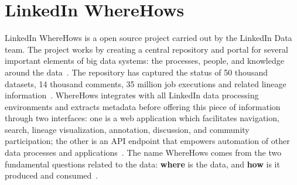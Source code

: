 \section{LinkedIn WhereHows}

LinkedIn WhereHows is a open source project carried out by the LinkedIn Data team. The project works 
by creating a central repository and portal for several important elements of big data systems: the 
processes, people, and knowledge around the data~\cite{hid-sp18-405-www-wherehows}. The 
repository has captured the status of 50 thousand datasets, 14 thousand comments, 35 million job 
executions and related lineage information~\cite{hid-sp18-405-www-wherehows}. WhereHows 
integrates with all LinkedIn data processing environments and extracts metadata before offering this 
piece of information through two interfaces: one is a web application which facilitates navigation, 
search, lineage visualization, annotation, discussion, and community participation; the other is 
an API endpoint that empowers automation of other data processes and 
applications~\cite{hid-sp18-405-www-wherehows}. The name WhereHows comes from the  two 
fundamental questions related to the data: \textbf{where} is the data, and \textbf{how} is it produced 
and consumed~\cite{hid-sp18-405-githubwiki-wherehows}.
